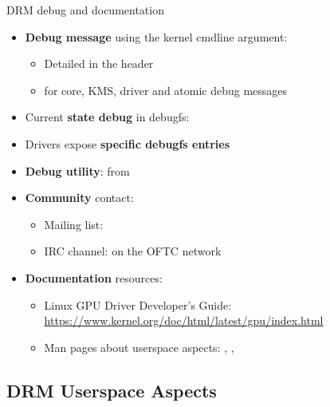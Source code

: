 \begin{frame}[fragile]{DRM debug and documentation}
  \begin{itemize}
  \item \textbf{Debug message} using the  kernel cmdline argument:
    \begin{itemize}
    \item Detailed in the  header
    \item {} for core, KMS, driver and atomic debug messages
    \end{itemize}
  \item Current \textbf{state debug} in debugfs: 
  \item Drivers expose \textbf{specific debugfs entries}
  \item \textbf{Debug utility}:  from 
  \item \textbf{Community} contact:
    \begin{itemize}
    \item Mailing list: 
    \item IRC channel:  on the OFTC network
    \end{itemize}
  \item \textbf{Documentation} resources:
    \begin{itemize}
    \item Linux GPU Driver Developer’s Guide: \url{https://www.kernel.org/doc/html/latest/gpu/index.html}
    \item Man pages about userspace aspects: , , 
    \end{itemize}
  \end{itemize}
\end{frame}

\subsection{DRM Userspace Aspects}

